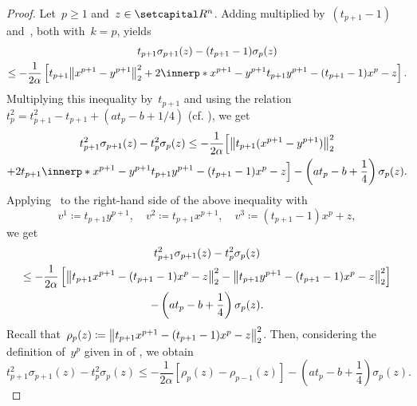 \documentclass[../main]{subfiles}
\begin{document}
\begin{proof}
    Let~$p \ge 1$ and~$z \in \setR^n$.
    Adding  multiplied by~$(t_{p + 1} - 1)$ and~, both with~$k = p$, yields
    \begin{multline}
        t_{p + 1} \sigma_{p + 1}(z) - (t_{p + 1} - 1) \sigma_p(z) \\
        \le - \frac{1}{2 \alpha} \left[ t_{p + 1} \norm*{x^{p + 1} - y^{p + 1}}_2^2 + 2 \innerp*{x^{p + 1} - y^{p + 1}}{t_{p + 1} y^{p + 1} - (t_{p + 1} - 1)x^p - z} \right]
    .\end{multline}
    Multiplying this inequality by~$t_{p + 1}$ and using the relation~$t_p^2 = t_{p + 1}^2 - t_{p + 1} + (a t_p - b + 1/4)$ (cf. ), we get
    \begin{multline}
        t_{p + 1}^2 \sigma_{p + 1}(z) - t_p^2 \sigma_p(z) \le - \frac{1}{2 \alpha} \Bigl[ \norm*{t_{p + 1} (x^{p + 1} - y^{p + 1})}_2^2  \\
        + 2 t_{p + 1} \innerp*{x^{p + 1} - y^{p + 1}}{t_{p + 1} y^{p + 1} - (t_{p + 1} - 1)x^p - z} \Bigr] - \left( a t_p - b + \frac{1}{4} \right) \sigma_p(z)
    .\end{multline}
    Applying~ to the right-hand side of the above inequality with
    \begin{equation}
        v^1 \coloneqq t_{p + 1} y^{p + 1}, \quad v^2 \coloneqq t_{p + 1} x^{p + 1}, \quad v^3 \coloneqq (t_{p + 1} - 1) x^p + z
    ,\end{equation}
    we get
    \begin{multline}
        t_{p + 1}^2 \sigma_{p + 1}(z) - t_p^2 \sigma_p(z) \\
        \le - \frac{1}{2 \alpha} \left[ \norm*{t_{p + 1} x^{p + 1} - (t_{p + 1} - 1) x^p - z}_2^2 - \norm*{t_{p + 1} y^{p + 1} - (t_{p + 1} - 1) x^p - z}_2^2 \right] \\
        - \left( a t_p - b + \frac{1}{4} \right) \sigma_p(z)
    .\end{multline}
    Recall that~$\rho_p(z) \coloneqq \norm*{t_{p + 1} x^{p + 1} - (t_{p + 1} - 1) x^p - z}_2^2$.
    Then, considering the definition of~$y^p$ given in  of , we obtain
    \begin{equation}
        t_{p + 1}^2 \sigma_{p + 1}(z) - t_p^2 \sigma_p(z) \le - \frac{1}{2 \alpha} \left[ \rho_p(z) - \rho_{p - 1}(z) \right] - \left( a t_p - b + \frac{1}{4} \right) \sigma_p(z)
    .\end{equation}

\end{proof}
\end{document}
